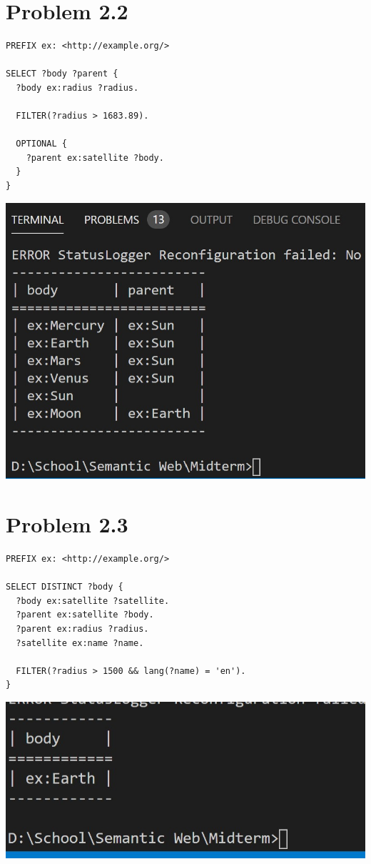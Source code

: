 \documentclass{article}
\newenvironment{problem}[1]{
  \nobreak\section*{Problem #1}
}{}
\begin{document}
  \pagebreak
  \begin{problem}{2.2}
    \begin{verbatim}
PREFIX ex: <http://example.org/>

SELECT ?body ?parent {
  ?body ex:radius ?radius.
  
  FILTER(?radius > 1683.89).
  
  OPTIONAL { 
    ?parent ex:satellite ?body.
  }
}
    \end{verbatim}
    \includegraphics{images/1.jpg}
  \end{problem}

  \pagebreak
  \begin{problem}{2.3}
    \begin{verbatim}
PREFIX ex: <http://example.org/>

SELECT DISTINCT ?body {
  ?body ex:satellite ?satellite.
  ?parent ex:satellite ?body.
  ?parent ex:radius ?radius.
  ?satellite ex:name ?name.
  
  FILTER(?radius > 1500 && lang(?name) = 'en').
}
    \end{verbatim}

    \includegraphics{images/2.jpg}
  \end{problem}
\end{document}
